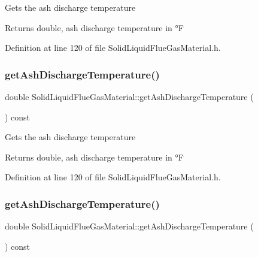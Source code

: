 Gets the ash discharge temperature \begin{DoxyReturn}{Returns}
double, ash discharge temperature in °F 
\end{DoxyReturn}


Definition at line 120 of file Solid\+Liquid\+Flue\+Gas\+Material.\+h.

\mbox{\label{class_solid_liquid_flue_gas_material_ab233d4e27397cc74fbe2d3084e4e6f7c}} 
\subsubsection{\texorpdfstring{get\+Ash\+Discharge\+Temperature()}{getAshDischargeTemperature()}\hspace{0.1cm}{\footnotesize\ttfamily [2/3]}}
{\footnotesize\ttfamily double Solid\+Liquid\+Flue\+Gas\+Material\+::get\+Ash\+Discharge\+Temperature (\begin{DoxyParamCaption}{ }\end{DoxyParamCaption}) const\hspace{0.3cm}{\ttfamily [inline]}}

Gets the ash discharge temperature \begin{DoxyReturn}{Returns}
double, ash discharge temperature in °F 
\end{DoxyReturn}


Definition at line 120 of file Solid\+Liquid\+Flue\+Gas\+Material.\+h.

\mbox{\label{class_solid_liquid_flue_gas_material_ab233d4e27397cc74fbe2d3084e4e6f7c}} 
\subsubsection{\texorpdfstring{get\+Ash\+Discharge\+Temperature()}{getAshDischargeTemperature()}\hspace{0.1cm}{\footnotesize\ttfamily [3/3]}}
{\footnotesize\ttfamily double Solid\+Liquid\+Flue\+Gas\+Material\+::get\+Ash\+Discharge\+Temperature (\begin{DoxyParamCaption}{ }\end{DoxyParamCaption}) const\hspace{0.3cm}{\ttfamily [inline]}}

